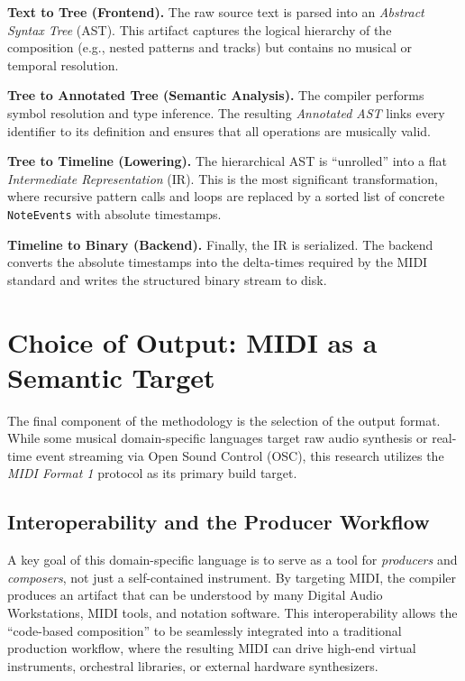 \noindent \textbf{Text to Tree (Frontend).} The raw source text is parsed into an \textit{Abstract Syntax Tree} (AST).
This artifact captures the logical hierarchy of the composition (e.g., nested patterns and tracks) but contains no
musical or temporal resolution.

\noindent \textbf{Tree to Annotated Tree (Semantic Analysis).} The compiler performs symbol resolution and
type inference.
The resulting \textit{Annotated AST} links every identifier to its definition and ensures that all operations are
musically valid.

\noindent \textbf{Tree to Timeline (Lowering).} The hierarchical AST is ``unrolled'' into a flat \textit{Intermediate
Representation} (IR).
This is the most significant transformation, where recursive pattern calls and loops are replaced by a sorted list
of concrete \texttt{NoteEvents} with absolute timestamps.

\noindent \textbf{Timeline to Binary (Backend).} Finally, the IR is serialized.
The backend converts the absolute timestamps into the delta-times required by the MIDI standard and writes the
structured binary stream to disk.


\section{Choice of Output: MIDI as a Semantic Target}\label{detail-sec:midi-target}

The final component of the methodology is the selection of the output format.
While some musical domain-specific languages target raw audio synthesis or real-time event streaming via Open
Sound Control (OSC), this
research utilizes the \textit{MIDI Format 1} protocol as its primary build target.

\subsection{Interoperability and the Producer Workflow}\label{detail-subsec:interoperability-and-the-producer-workflow}

A key goal of this domain-specific language is to serve as a tool for \textit{producers} and
\textit{composers}, not just a self-contained
instrument.
By targeting MIDI, the compiler produces an artifact that can be understood by many Digital Audio
Workstations, MIDI tools, and notation software.
This interoperability allows the ``code-based composition'' to be seamlessly integrated into a traditional production
workflow, where the resulting MIDI can drive high-end virtual instruments, orchestral libraries, or external hardware
synthesizers.

